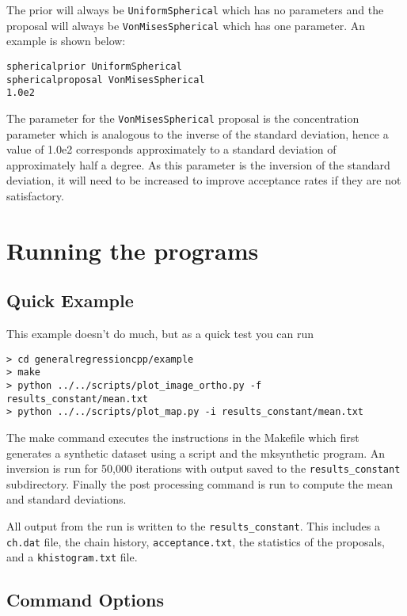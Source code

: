 \documentclass{article}
\begin{document}
The prior will always be {\tt UniformSpherical} which has no parameters
and the proposal will always be {\tt VonMisesSpherical} which has one
parameter. An example is shown below:

\begin{verbatim}
sphericalprior UniformSpherical
sphericalproposal VonMisesSpherical
1.0e2
\end{verbatim}

The parameter for the {\tt VonMisesSpherical} proposal is the
concentration parameter which is analogous to the inverse of the
standard deviation, hence a value of 1.0e2 corresponds approximately
to a standard deviation of approximately half a degree. As this
parameter is the inversion of the standard deviation, it will need
to be increased to improve acceptance rates if they are not satisfactory.

\section{Running the programs}

\subsection{Quick Example}

This example doesn't do much, but as a quick test you can run

\begin{verbatim}
> cd generalregressioncpp/example
> make
> python ../../scripts/plot_image_ortho.py -f results_constant/mean.txt
> python ../../scripts/plot_map.py -i results_constant/mean.txt
\end{verbatim}

The make command executes the instructions in the Makefile
which first generates a synthetic dataset using a script
and the mksynthetic program. An inversion is run for 50,000
iterations with output saved to the {\tt results\_constant}
subdirectory. Finally the post processing command is run to
compute the mean and standard deviations.

All output from the run is written to the {\tt results\_constant}. This
includes a {\tt ch.dat} file, the chain history, {\tt acceptance.txt}, the statistics
of the proposals, and a {\tt khistogram.txt} file.

\subsection{Command Options}
\end{document}
